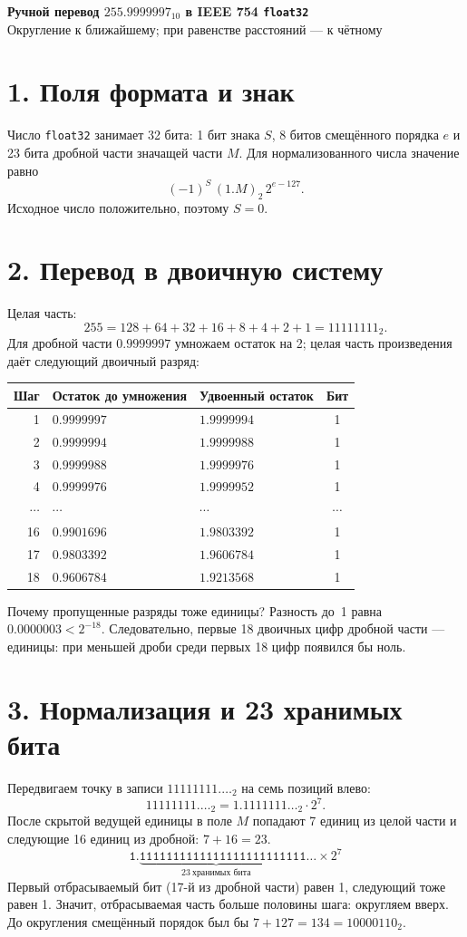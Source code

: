 \documentclass[a4paper,12pt]{extarticle}
\begin{document}
\begin{center}
    {\Large\bfseries Ручной перевод $255.9999997_{10}$ в IEEE 754 \texttt{float32}}\\[3mm]
    Округление к ближайшему; при равенстве расстояний --- к чётному
\end{center}

\section*{1. Поля формата и знак}
Число \texttt{float32} занимает 32 бита: 1 бит знака $S$, 8 битов
смещённого порядка $e$ и 23 бита дробной части значащей части $M$.
Для нормализованного числа значение равно
\[
    (-1)^S\,(1.M)_2\,2^{e-127}.
\]
Исходное число положительно, поэтому $\boxed{S=0}$.

\section*{2. Перевод в двоичную систему}
Целая часть:
\[
    255=128+64+32+16+8+4+2+1=11111111_2.
\]
Для дробной части $0.9999997$ умножаем остаток на 2; целая часть
произведения даёт следующий двоичный разряд:
\begin{center}
\begin{tabular}{@{}rllc@{}}
\toprule
Шаг & Остаток до умножения & Удвоенный остаток & Бит \\
\midrule
1  & $0.9999997$ & $1.9999994$ & 1 \\
2  & $0.9999994$ & $1.9999988$ & 1 \\
3  & $0.9999988$ & $1.9999976$ & 1 \\
4  & $0.9999976$ & $1.9999952$ & 1 \\
$\cdots$ & $\cdots$ & $\cdots$ & $\cdots$ \\
16 & $0.9901696$ & $1.9803392$ & 1 \\
17 & $0.9803392$ & $1.9606784$ & 1 \\
18 & $0.9606784$ & $1.9213568$ & 1 \\
\bottomrule
\end{tabular}
\end{center}
Почему пропущенные разряды тоже единицы? Разность до~1 равна
$0.0000003 < 2^{-18}$. Следовательно, первые 18 двоичных цифр дробной
части --- единицы: при меньшей дроби среди первых 18 цифр появился бы ноль.

\clearpage
\section*{3. Нормализация и 23 хранимых бита}
Передвигаем точку в записи $11111111.\ldots_2$ на семь позиций влево:
\[
    11111111.\ldots_2=1.1111111\ldots_2\cdot 2^7.
\]
После скрытой ведущей единицы в поле $M$ попадают 7 единиц из целой
части и следующие 16 единиц из дробной: $7+16=23$.
\[
    \mathtt{1.}\underbrace{\mathtt{11111111111111111111111}}_{23\ \text{хранимых бита}}
    \mathtt{11}\ldots\times 2^7
\]
Первый отбрасываемый бит (17-й из дробной части) равен 1, следующий
тоже равен 1. Значит, отбрасываемая часть больше половины шага:
округляем вверх. До округления смещённый порядок был бы
$7+127=134=10000110_2$.
\end{document}
